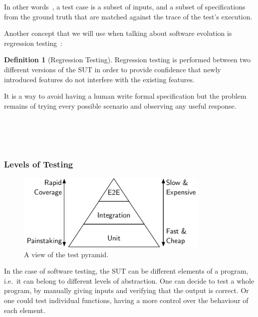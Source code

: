 \documentclass[11pt]{sdm_internship}
\newcommand{\todo}[1]{\colorbox{Red!75}{\textcolor{white}{\textbf{TODO\ifx&#1&\else: #1\fi}}}}
\theoremstyle{definition}
\newtheorem{definition}{Definition}[section]
\begin{document}
In other words~\cite{bernot1991software}, a test case is a subset of inputs, and a subset of specifications from the ground truth that are matched against the trace of the test's execution.

Another concept that we will use when talking about software evolution is regression testing~\cite{yoo2012regression}:

\begin{definition}[Regression Testing]
  Regression testing is performed between two different versions of the SUT in order to provide confidence that newly introduced features do not interfere with the existing features.
\end{definition}

It is a way to avoid having a human write formal specification but the problem remains of trying every possible scenario and observing any useful response.

\todo{give some clues to each concept to tell why it is a field of research?}

\subsubsection{Levels of Testing}%
\label{sssec:levels_testing}
\begin{figure}
  \centering
  \includegraphics[width=25em]{test_pyramid}
  \caption{A view of the test pyramid.}%
  \label{fig:test_pyramid}
\end{figure}

In the case of software testing, the SUT can be different elements of a program, i.e.\ it can belong to different levels of abstraction.
One can decide to test a whole program, by manually giving inputs and verifying that the output is correct.
Or one could test individual functions, having a more control over the behaviour of each element.
\end{document}
